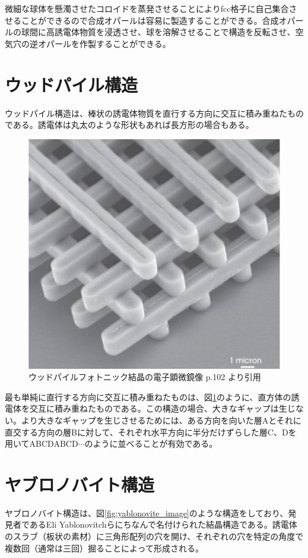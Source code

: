 \documentclass[platex,dvipdfmx,draft]{jsreport}
\numberwithin{equation}{section}
\begin{document}
微細な球体を懸濁させたコロイドを蒸発させることによりfcc格子に自己集合させることができるので合成オパールは容易に製造することができる。合成オパールの球間に高誘電体物質を浸透させ、球を溶解させることで構造を反転させ、空気穴の逆オパールを作製することができる。

\section{ウッドパイル構造}
ウッドパイル構造は、棒状の誘電体物質を直行する方向に交互に積み重ねたものである。誘電体は丸太のような形状もあれば長方形の場合もある。

\begin{figure}[htbp]
  \centering
  \includegraphics[width=0.6\linewidth]{woodpile.png}
  \caption{ウッドパイルフォトニック結晶の電子顕微鏡像 \cite{text} p.102 より引用}
  \label{fig:woodpile_image}
\end{figure}

最も単純に直行する方向に交互に積み重ねたものは、図\ref{fig:woodpile_image}のように、直方体の誘電体を交互に積み重ねたものである。この構造の場合、大きなギャップは生じない。より大きなギャップを生じさせるためには、ある方向を向いた層Aとそれに直交する方向の層Bに対して、それぞれ水平方向に半分だけずらした層C、Dを用いてABCDABCD$\cdots$のように並べることが有効である。

\section{ヤブロノバイト構造}
ヤブロノバイト構造は、図\ref{fig:yablonovite_image}のような構造をしており、発見者であるEli Yablonovitchらにちなんで名付けられた結晶構造である。誘電体のスラブ（板状の素材）に三角形配列の穴を開け、それぞれの穴を特定の角度で複数回（通常は三回）掘ることによって形成される。
\end{document}
